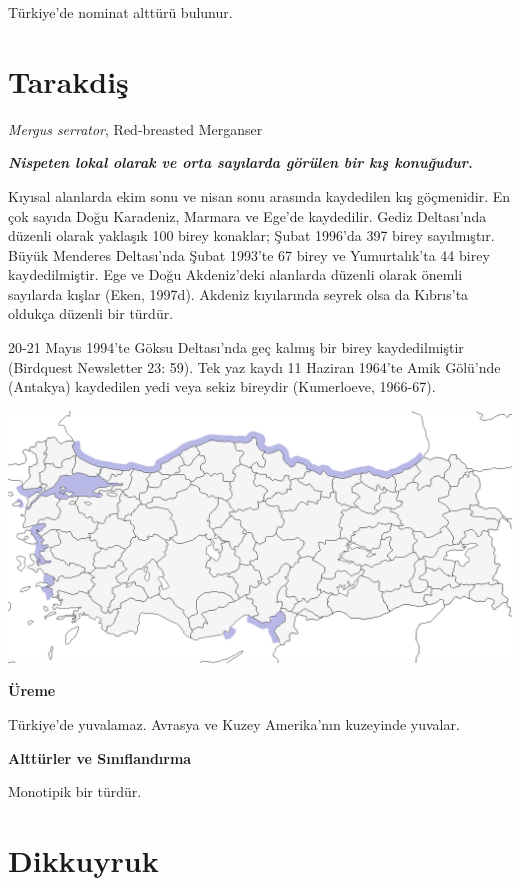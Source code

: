 \documentclass[
  a4paper,
  DIV=11,
  numbers=noendperiod]{scrartcl}
\begin{document}
Türkiye'de nominat alttürü bulunur.

\section{Tarakdiş}\label{tarakdiux15f}

\emph{Mergus serrator}, Red-breasted Merganser

\textbf{\emph{Nispeten lokal olarak ve orta sayılarda görülen bir kış
konuğudur.}}

Kıyısal alanlarda ekim sonu ve nisan sonu arasında kaydedilen kış
göçmenidir. En çok sayıda Doğu Karadeniz, Marmara ve Ege'de kaydedilir.
Gediz Deltası'nda düzenli olarak yaklaşık 100 birey konaklar; Şubat
1996'da 397 birey sayılmıştır. Büyük Menderes Deltası'nda Şubat 1993'te
67 birey ve Yumurtalık'ta 44 birey kaydedilmiştir. Ege ve Doğu
Akdeniz'deki alanlarda düzenli olarak önemli sayılarda kışlar (Eken,
1997d). Akdeniz kıyılarında seyrek olsa da Kıbrıs'ta oldukça düzenli bir
türdür.

20-21 Mayıs 1994'te Göksu Deltası'nda geç kalmış bir birey
kaydedilmiştir (Birdquest Newsletter 23: 59). Tek yaz kaydı 11 Haziran
1964'te Amik Gölü'nde (Antakya) kaydedilen yedi veya sekiz bireydir
(Kumerloeve, 1966-67).

\includegraphics{images/harita_Mergus serrator.png}

\textbf{Üreme}

Türkiye'de yuvalamaz. Avrasya ve Kuzey Amerika'nın kuzeyinde yuvalar.

\textbf{Alttürler ve Sınıflandırma}

Monotipik bir türdür.

\section{Dikkuyruk}\label{dikkuyruk}
\end{document}
